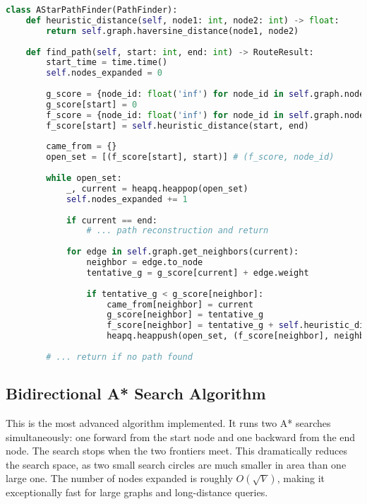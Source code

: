 \documentclass[12pt, a4paper]{report}
\begin{document}
\begin{lstlisting}[language=Python, caption={Code Snippet: `AStarPathFinder' from `algorithms.py'}, label={lst:astar}]
class AStarPathFinder(PathFinder):
    def heuristic_distance(self, node1: int, node2: int) -> float:
        return self.graph.haversine_distance(node1, node2)
    
    def find_path(self, start: int, end: int) -> RouteResult:
        start_time = time.time()
        self.nodes_expanded = 0
        
        g_score = {node_id: float('inf') for node_id in self.graph.nodes}
        g_score[start] = 0
        f_score = {node_id: float('inf') for node_id in self.graph.nodes}
        f_score[start] = self.heuristic_distance(start, end)
        
        came_from = {}
        open_set = [(f_score[start], start)] # (f_score, node_id)
        
        while open_set:
            _, current = heapq.heappop(open_set)
            self.nodes_expanded += 1
            
            if current == end:
                # ... path reconstruction and return
            
            for edge in self.graph.get_neighbors(current):
                neighbor = edge.to_node
                tentative_g = g_score[current] + edge.weight
                
                if tentative_g < g_score[neighbor]:
                    came_from[neighbor] = current
                    g_score[neighbor] = tentative_g
                    f_score[neighbor] = tentative_g + self.heuristic_distance(neighbor, end)
                    heapq.heappush(open_set, (f_score[neighbor], neighbor))
        
        # ... return if no path found
\end{lstlisting}

\subsection{Bidirectional A* Search Algorithm}
This is the most advanced algorithm implemented. It runs two A* searches simultaneously: one forward from the start node and one backward from the end node. The search stops when the two frontiers meet. This dramatically reduces the search space, as two small search circles are much smaller in area than one large one. The number of nodes expanded is roughly $O(\sqrt{V})$, making it exceptionally fast for large graphs and long-distance queries.
\end{document}
